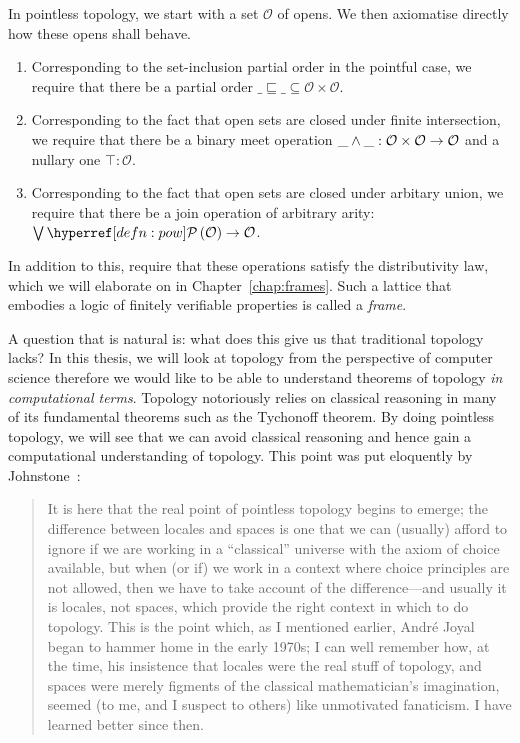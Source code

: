 In pointless topology, we start with a set $\mathcal{O}$ of opens. We then axiomatise
directly how these opens shall behave.
\begin{enumerate}
  \item Corresponding to the set-inclusion partial order in the pointful case, we require that
    there be a partial order $\_\sqsubseteq\_ \subseteq \mathcal{O} \times \mathcal{O}$.
  \item Corresponding to the fact that open sets are closed under finite intersection, we
    require that there be a binary meet operation $\_ \wedge \_ : \mathcal{O} \times
    \mathcal{O} \rightarrow \mathcal{O}$ and a nullary one $\top : \mathcal{O}$.
  \item Corresponding to the fact that open sets are closed under arbitary union, we
    require that there be a join operation of arbitrary arity: $\joinnm{}\_ :
    \pow{\mathcal{O}} \rightarrow \mathcal{O}$.
\end{enumerate}
In addition to this, require that these operations satisfy the distributivity law, which
we will elaborate on in Chapter~\ref{chap:frames}. Such a lattice that embodies a logic
of finitely verifiable properties is called a \emph{frame}.

 A question that is natural
is: what does this give us that traditional topology lacks? In this thesis, we will look
at topology from the perspective of computer science therefore we would like to be able to
understand theorems of topology \emph{in computational terms}. Topology notoriously relies
on classical reasoning in many of its fundamental theorems such as the Tychonoff theorem.
By doing pointless topology, we will see that we can avoid classical reasoning and hence
gain a computational understanding of topology. This point was put eloquently by
Johnstone~\cite[pg.~46]{stone-spaces}:
\begin{quote}
  It is here that the real point of pointless topology begins to emerge; the difference
  between locales and spaces is one that we can (usually) afford to ignore if we are
  working in a ``classical'' universe with the axiom of choice available, but when (or if)
  we work in a context where choice principles are not allowed, then we have to take
  account of the difference—and usually it is locales, not spaces, which provide the right
  context in which to do topology. This is the point which, as I mentioned earlier,
  Andr\'{e} Joyal began to hammer home in the early 1970s; I can well remember how, at the
  time, his insistence that locales were the real stuff of topology, and spaces were
  merely figments of the classical mathematician's imagination, seemed (to me, and I
  suspect to others) like unmotivated fanaticism. I have learned better since then.
\end{quote}

